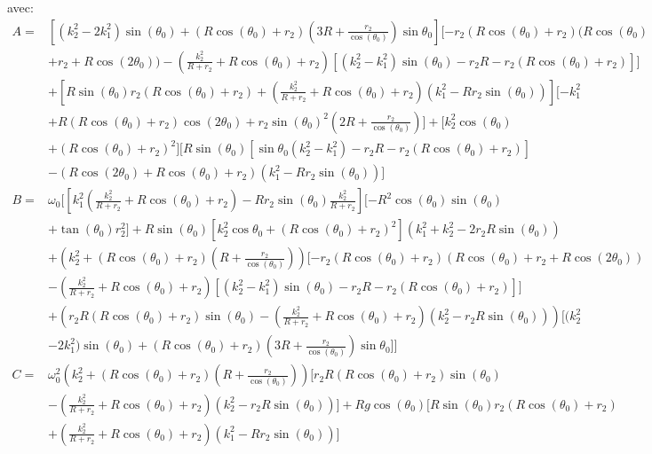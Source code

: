 avec:
\begin{align}
    A=&[(k_2^2-2 k_1^2)  \sin(\theta_0)+ (R \cos(\theta_0)+r_2)(3R+\frac{r_2}{\cos(\theta_0)}) \sin{\theta_0}][-r_2 (R\cos(\theta_0)+r_2) (R\cos(\theta_0) \nonumber\\
    &+r_2+R\cos(2\theta_0))-(\frac{k_2^2}{R+r_2} + R\cos(\theta_0)+r_2)[(k_2^2-k_1^2)\sin(\theta_0) -r_2 R -r_2(R\cos(\theta_0)+r_2)]]\nonumber\\
    &+[R \sin(\theta_0)r_2 (R\cos(\theta_0)+r_2)+(\frac{k_2^2}{R+r_2} + R\cos(\theta_0)+r_2)(k_1^2-R r_2 \sin(\theta_0))][-k_1^2  \nonumber\\
    &+ R(R\cos(\theta_0)+r_2)\cos(2\theta_0) +  r_2\sin(\theta_0)^2 (2R+\frac{r_2}{\cos(\theta_0)}) ]+[k_2^2  \cos(\theta_0) \nonumber\\
    &+(R\cos(\theta_0)+r_2)^2][R \sin(\theta_0)[ \sin{\theta_0}(k_2^2-k_1^2) -r_2 R  -r_2(R\cos(\theta_0)+r_2)]\nonumber\\
    &-(R\cos(2\theta_0)+ R\cos(\theta_0)+r_2)(k_1^2-R r_2 \sin(\theta_0))] \nonumber\\
    B=&\omega_0[[k_1^2(\frac{k_2^2}{R+r_2} + R\cos(\theta_0)+r_2)-R r_2 \sin(\theta_0)\frac{k_2^2}{R+r_2}
    ][- R^2\cos(\theta_0)\sin(\theta_0)\nonumber\\
    &+ \tan(\theta_0) r_2^2 ]+R \sin(\theta_0)[k_2^2  \cos{\theta_0} +(R\cos(\theta_0)+r_2)^2](k_1^2+k_2^2 -2r_2 R\sin(\theta_0))\nonumber\\
    &+ (k_2^2 +(R \cos(\theta_0)+r_2)(R+\frac{r_2}{\cos(\theta_0)}) )[-r_2 (R\cos(\theta_0)+r_2) (R\cos(\theta_0)+r_2+R\cos(2\theta_0))\nonumber\\
    &-(\frac{k_2^2}{R+r_2} + R\cos(\theta_0)+r_2)[(k_2^2-k_1^2)\sin(\theta_0) -r_2 R -r_2(R\cos(\theta_0)+r_2)]]\nonumber\\
    &+(r_2R(R\cos(\theta_0)+r_2) \sin(\theta_0)-(\frac{k_2^2}{R+r_2} + R\cos(\theta_0)+r_2)(k_2^2-r_2 R\sin(\theta_0)))[(k_2^2\nonumber\\
    &-2 k_1^2)  \sin(\theta_0)+ (R \cos(\theta_0)+r_2)(3R+\frac{r_2}{\cos(\theta_0)}) \sin{\theta_0}]]\nonumber\\
    C=&\omega_0^2(k_2^2 +(R \cos(\theta_0)+r_2)(R+\frac{r_2}{\cos(\theta_0)}) )[r_2R(R\cos(\theta_0)+r_2) \sin(\theta_0)\nonumber\\
    &-(\frac{k_2^2}{R+r_2} + R\cos(\theta_0)+r_2)(k_2^2-r_2 R\sin(\theta_0))]+R g\cos(\theta_0)[R \sin(\theta_0)r_2 (R\cos(\theta_0)+r_2)\nonumber\\
    &+(\frac{k_2^2}{R+r_2} + R\cos(\theta_0)+r_2)(k_1^2-R r_2 \sin(\theta_0))]
\label{eq:b32}
\end{align}

